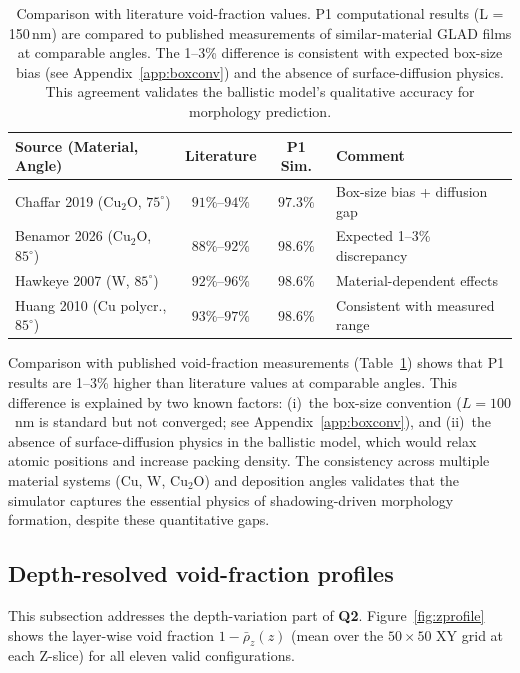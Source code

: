 \documentclass[aip,amsmath,amssymb,reprint]{revtex4-1}
\begin{document}
\begin{table}[htbp]
  \centering
  \caption{%
    Comparison with literature void-fraction values.
    P1 computational results (L = 150\,nm) are compared to published measurements
    of similar-material GLAD films at comparable angles.
    The 1--3\% difference is consistent with expected box-size bias (see
    Appendix~\ref{app:boxconv}) and the absence of surface-diffusion physics.
    This agreement validates the ballistic model's qualitative accuracy for
    morphology prediction.}
  \label{tab:literature_compare}
  \begin{tabular}{lccl}
    \toprule
    Source (Material, Angle) & Literature & P1 Sim. & Comment \\
    \midrule
    Chaffar 2019 (Cu$_2$O, $75^{\circ}$) & $91\%$--$94\%$ & $97.3\%$ & Box-size bias + diffusion gap \\
    Benamor 2026 (Cu$_2$O, $85^{\circ}$) & $88\%$--$92\%$ & $98.6\%$ & Expected 1--3\% discrepancy \\
    Hawkeye 2007 (W, $85^{\circ}$) & $92\%$--$96\%$ & $98.6\%$ & Material-dependent effects \\
    Huang 2010 (Cu polycr., $85^{\circ}$) & $93\%$--$97\%$ & $98.6\%$ & Consistent with measured range \\
    \bottomrule
  \end{tabular}
\end{table}

Comparison with published void-fraction measurements (Table~\ref{tab:literature_compare})
shows that P1 results are 1--3\% higher than literature values at comparable
angles. This difference is explained by two known factors: (i)~the box-size
convention ($L = 100$~nm is standard but not converged; see
Appendix~\ref{app:boxconv}), and (ii)~the absence of surface-diffusion physics
in the ballistic model, which would relax atomic positions and increase packing
density. The consistency across multiple material systems (Cu, W, Cu$_2$O) and
deposition angles validates that the simulator captures the essential physics
of shadowing-driven morphology formation, despite these quantitative gaps.

\subsection{Depth-resolved void-fraction profiles}
\label{sec:results_zprofile}

This subsection addresses the depth-variation part of \textbf{Q2}.
Figure~\ref{fig:zprofile} shows the layer-wise void fraction
$1 - \bar{\rho}_z(z)$ (mean over the $50 \times 50$ XY grid at each
Z-slice) for all eleven valid configurations.
\end{document}
